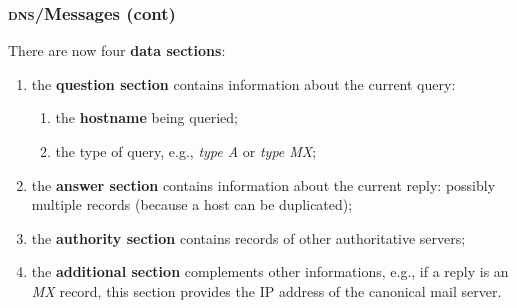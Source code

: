 %
\begin{frame}
\frametitle{\textsc{dns}/Messages (cont)}

There are now four \textbf{data sections}:

\begin{enumerate}

  \item the \textbf{question section} contains information about the
  current query:
  \begin{enumerate}

    \item the \textbf{hostname} being queried;

    \item the type of query, e.g., \emph{type A} or \emph{type MX};

  \end{enumerate}

  \item the \textbf{answer section} contains information about the
    current reply: possibly multiple records (because a host can be
    duplicated);

  \item the \textbf{authority section} contains records of other
    authoritative servers;

  \item the \textbf{additional section} complements other
    informations, e.g., if a reply is an \emph{MX} record, this section
    provides the IP address of the canonical mail server.

\end{enumerate}

\end{frame}
